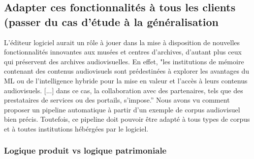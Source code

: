 \subsection{Adapter ces fonctionnalités à tous les clients (passer du cas d’étude à la généralisation} 

L'éditeur logiciel aurait un rôle à jouer dans la mise à disposition de nouvelles fonctionnalités innovantes aux musées et centres d'archives, d'autant plus ceux qui préservent des archives audiovisuelles. En effet, "les institutions de mémoire contenant des contenus audiovisuels sont prédestinées à explorer les avantages du ML ou de l'intelligence hybride pour la mise en valeur et l'accès à leurs contenus audiovisuels. [...] dans ce cas, la collaboration avec des partenaires, tels que des prestataires de services ou des portails, s'impose.” Nous avons vu comment proposer un pipeline automatique à partir d'un exemple de corpus audiovisuel bien précis. Toutefois, ce pipeline doit pouvoir être adapté à tous types de corpus et à toutes institutions hébérgées par le logiciel.  

\subsubsection{Logique produit vs logique patrimoniale}


